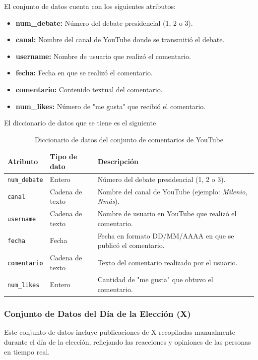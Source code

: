 \documentclass[10pt, a4paper]{article}
\begin{document}
	El conjunto de datos cuenta con los siguientes atributos:
	
	\begin{itemize}
		\item \textbf{num\_debate:} Número del debate presidencial (1, 2 o 3).
		\item \textbf{canal:} Nombre del canal de YouTube donde se transmitió el debate.
		\item \textbf{username:} Nombre de usuario que realizó el comentario.
		\item \textbf{fecha:} Fecha en que se realizó el comentario.
		\item \textbf{comentario:} Contenido textual del comentario.
		\item \textbf{num\_likes:} Número de "me gusta" que recibió el comentario.
	\end{itemize}
	
	El diccionario de datos que se tiene es el siguiente
	
	\begin{table}[h]
		\centering
		\begin{tabular}{llp{9cm}}
			\hline
			\textbf{Atributo} & \textbf{Tipo de dato} & \textbf{Descripción} \\
			\hline
			\texttt{num\_debate} & Entero & Número del debate presidencial (1, 2 o 3). \\
			\texttt{canal} & Cadena de texto & Nombre del canal de YouTube (ejemplo: \textit{Milenio}, \textit{Nmás}). \\
			\texttt{username} & Cadena de texto & Nombre de usuario en YouTube que realizó el comentario. \\
			\texttt{fecha} & Fecha & Fecha en formato DD/MM/AAAA en que se publicó el comentario. \\
			\texttt{comentario} & Cadena de texto & Texto del comentario realizado por el usuario. \\
			\texttt{num\_likes} & Entero & Cantidad de "me gusta" que obtuvo el comentario. \\
			\hline
		\end{tabular}
		\caption{Diccionario de datos del conjunto de comentarios de YouTube}
	\end{table}
	
	\subsubsection{Conjunto de Datos del Día de la Elección (X)}
	
	Este conjunto de datos incluye publicaciones de X recopiladas manualmente durante el día de la elección, reflejando las reacciones y opiniones de las personas en tiempo real.
	
\end{document}

